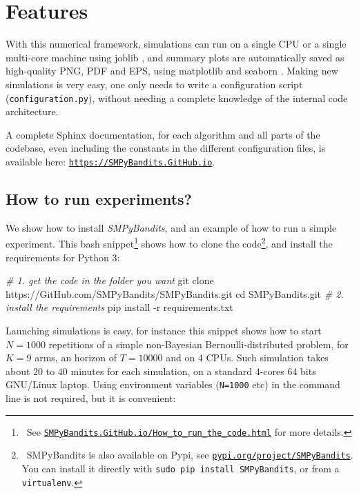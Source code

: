 \documentclass[a4paper,10pt,]{article}
\newenvironment{Shaded}{}{}
\newcommand{\BuiltInTok}[1]{#1}
\newcommand{\CommentTok}[1]{\textcolor[rgb]{0.38,0.63,0.69}{\textit{#1}}}
\newcommand{\ExtensionTok}[1]{#1}
\newcommand{\FunctionTok}[1]{\textcolor[rgb]{0.02,0.16,0.49}{#1}}
\newcommand{\NormalTok}[1]{#1}
\begin{document}
\section{Features}\label{features}

With this numerical framework, simulations can run on a single CPU or a
single multi-core machine using joblib \citep{joblib}, and summary plots are
automatically saved as high-quality PNG, PDF and EPS, using matplotlib \citep{matplotlib} and
seaborn \citep{seaborn}. Making new simulations is very easy, one only
needs to write a configuration script (\texttt{configuration.py}), without needing a complete knowledge of the internal code architecture.

A complete Sphinx documentation, for each algorithm and all parts of the codebase, even including the constants in the different configuration files, is available here:
\href{SMPyBandits.GitHub.io/}{\texttt{https://SMPyBandits.GitHub.io}}.

\subsection{How to run experiments?}\label{how-to-run-the-experiments}

We show how to install \emph{SMPyBandits}, and an example of how to run
a simple experiment. This bash snippet\footnote{~See
\href{https://SMPyBandits.GitHub.io/How_to_run_the_code.html}{\texttt{SMPyBandits.GitHub.io/How\_to\_run\_the\_code.html}}
for more details.} shows how to clone the code\footnote{~SMPyBandits is also available on Pypi, see
\href{https://pypi.org/project/SMPyBandits/}{\texttt{pypi.org/project/SMPyBandits}}.
You can install it directly with
\texttt{sudo\ pip\ install\ SMPyBandits}, or from a
\texttt{virtualenv}.}, and install the requirements for Python 3:

\begin{Shaded}
\begin{Highlighting}[]
\CommentTok{# 1. get the code in the folder you want}
\NormalTok{\textdollar }\FunctionTok{git}\NormalTok{ clone https://GitHub.com/SMPyBandits/SMPyBandits.git}
\NormalTok{\textdollar }\BuiltInTok{cd}\NormalTok{ SMPyBandits.git}
\CommentTok{# 2. install the requirements}
\NormalTok{\textdollar }\ExtensionTok{pip}\NormalTok{ install -r requirements.txt}
\end{Highlighting}
\end{Shaded}

Launching simulations is easy, for instance this snippet shows how to
start \(N=1000\) repetitions of a simple non-Bayesian
Bernoulli-distributed problem, for \(K=9\) arms, an horizon of
\(T=10000\) and on \(4\) CPUs. Such simulation takes about \(20\) to \(40\) minutes
for each simulation, on a standard \(4\)-cores \(64\) bits GNU/Linux
laptop. Using environment variables (\texttt{N=1000} etc) in the command
line is not required, but it is convenient:
\end{document}
